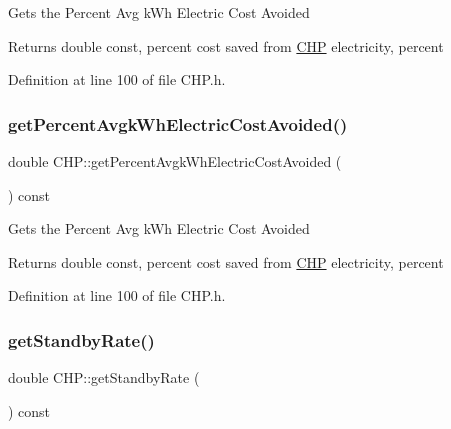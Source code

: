 Gets the Percent Avg k\+Wh Electric Cost Avoided

\begin{DoxyReturn}{Returns}
double const, percent cost saved from \hyperlink{class_c_h_p}{C\+HP} electricity, percent 
\end{DoxyReturn}


Definition at line 100 of file C\+H\+P.\+h.

\mbox{\label{class_c_h_p_ad79607b304d1e50a9421de043b7a9e7b}} 
\subsubsection{\texorpdfstring{get\+Percent\+Avgk\+Wh\+Electric\+Cost\+Avoided()}{getPercentAvgkWhElectricCostAvoided()}\hspace{0.1cm}{\footnotesize\ttfamily [3/3]}}
{\footnotesize\ttfamily double C\+H\+P\+::get\+Percent\+Avgk\+Wh\+Electric\+Cost\+Avoided (\begin{DoxyParamCaption}{ }\end{DoxyParamCaption}) const\hspace{0.3cm}{\ttfamily [inline]}}

Gets the Percent Avg k\+Wh Electric Cost Avoided

\begin{DoxyReturn}{Returns}
double const, percent cost saved from \hyperlink{class_c_h_p}{C\+HP} electricity, percent 
\end{DoxyReturn}


Definition at line 100 of file C\+H\+P.\+h.

\mbox{\label{class_c_h_p_a195f0ffe163404077b56a5e5db8eb59c}} 
\subsubsection{\texorpdfstring{get\+Standby\+Rate()}{getStandbyRate()}\hspace{0.1cm}{\footnotesize\ttfamily [1/3]}}
{\footnotesize\ttfamily double C\+H\+P\+::get\+Standby\+Rate (\begin{DoxyParamCaption}{ }\end{DoxyParamCaption}) const\hspace{0.3cm}{\ttfamily [inline]}}

